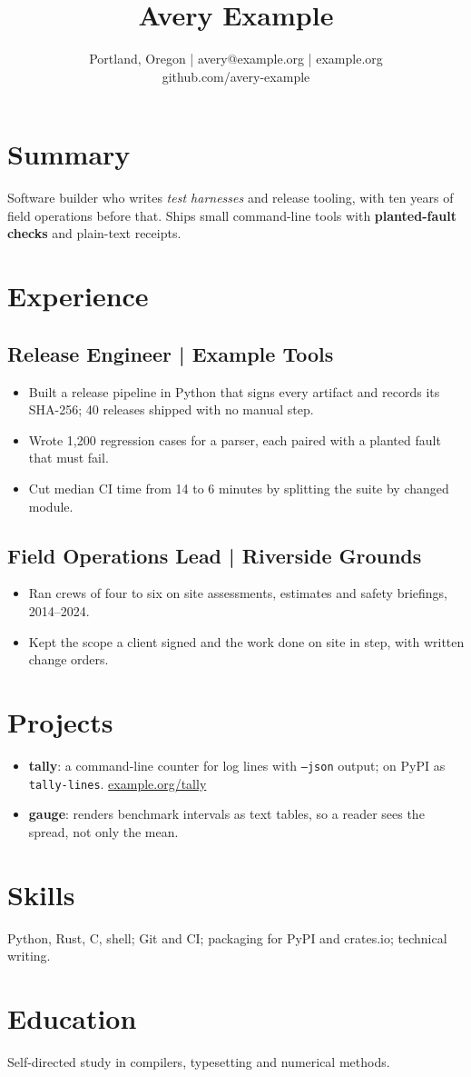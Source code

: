 \documentclass[11pt]{article}
\title{Avery Example}
\author{Portland, Oregon | avery@example.org | example.org \\ github.com/avery-example}
\begin{document}
\maketitle

\section*{Summary}
Software builder who writes \emph{test harnesses} and release tooling, with ten years of field operations
before that. Ships small command-line tools with \textbf{planted-fault checks} and plain-text receipts.

\section{Experience}
\subsection{Release Engineer | Example Tools}
\begin{itemize}
  \item Built a release pipeline in Python that signs every artifact and records its SHA-256; 40 releases
        shipped with no manual step.
  \item Wrote 1,200 regression cases for a parser, each paired with a planted fault that must fail.
  \item Cut median CI time from 14 to 6 minutes by splitting the suite by changed module.
\end{itemize}
\subsection{Field Operations Lead | Riverside Grounds}
\begin{itemize}
  \item Ran crews of four to six on site assessments, estimates and safety briefings, 2014--2024.
  \item Kept the scope a client signed and the work done on site in step, with written change orders.
\end{itemize}

\section{Projects}
\begin{itemize}
  \item \textbf{tally}: a command-line counter for log lines with \texttt{--json} output;
        on PyPI as \texttt{tally-lines}. \href{https://example.org/tally}{example.org/tally}
  \item \textbf{gauge}: renders benchmark intervals as text tables, so a reader sees the spread,
        not only the mean.
\end{itemize}

\section{Skills}
Python, Rust, C, shell; Git and CI; packaging for PyPI and crates.io; technical writing.

\section{Education}
Self-directed study in compilers, typesetting and numerical methods.
\end{document}
